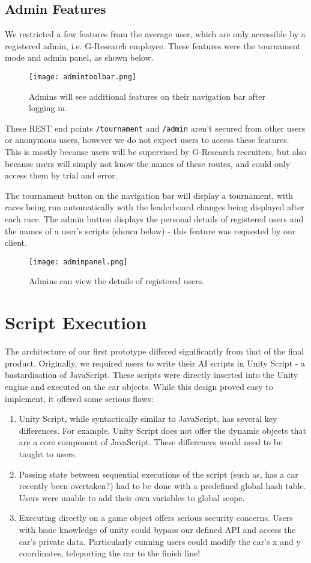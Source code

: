 \subsection{Admin Features}

We restricted a few features from the average user, which are only accessible by a registered admin, i.e. G-Research employee. These features were the tournament mode and admin panel, as shown below.

\begin{figure}[H]
\centering
\texttt{[image: admintoolbar.png]}
\caption{Admins will see additional features on their navigation bar after logging in.}
\end{figure}

These REST end points {\tt/tournament} and {\tt/admin} aren't secured from other users or anonymous users, however we do not expect users to access these features. This is mostly because users will be supervised by G-Research recruiters, but also because users will simply not know the names of these routes, and could only access them by trial and error.

The tournament button on the navigation bar will display a tournament, with races being run automatically with the leaderboard changes being displayed after each race. The admin button displays the personal details of registered users and the names of a user's scripts (shown below) - this feature was requested by our client. 
\begin{figure}[H]
\centering
\texttt{[image: adminpanel.png]}
\caption{Admins can view the details of registered users.}
\end{figure}

\section{Script Execution}
The architecture of our first prototype differed significantly from that of the final product. Originally, we required users to write their AI scripts in Unity Script - a bastardisation of JavaScript. These scripts were directly inserted into the Unity engine and executed on the car objects. While this design proved easy to implement, it offered some serious flaws:
\begin{enumerate}
\item Unity Script, while syntactically similar to JavaScript, has several key differences. For example, Unity Script does not offer the dynamic objects that are a core component of JavaScript. These differences would need to be taught to users.
\item Passing state between sequential executions of the script (such as, has a car recently been overtaken?) had to be done with a predefined global hash table. Users were unable to add their own variables to global scope.
\item Executing directly on a game object offers serious security concerns. Users with basic knowledge of unity could bypass our defined API and access the car's private data. Particularly cunning users could modify the car's x and y coordinates, teleporting the car to the finish line!
\end{enumerate}

